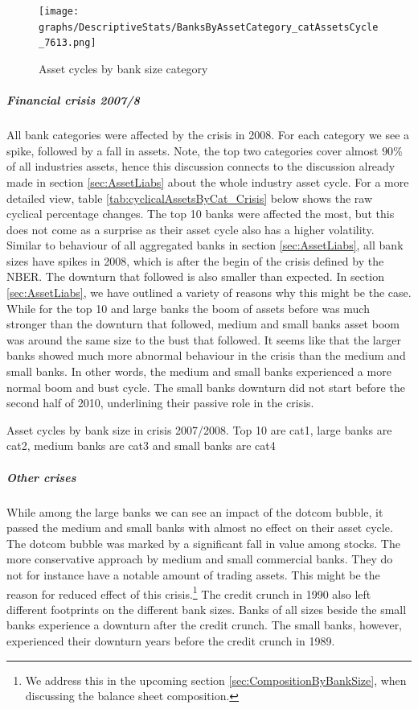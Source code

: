 \documentclass[12pt, a4paper]{article} %
\begin{document}
\begin{figure}[H]
\begin{minipage}{\textwidth}
\texttt{[image: graphs/DescriptiveStats/BanksByAssetCategory\_catAssetsCycle\_7613.png]}
\centering
\caption[1]{Asset cycles by bank size category}
\label{fig:catassetscycle}
\end{minipage}
\end{figure}

\subparagraph{Financial crisis 2007/8}
All bank categories were affected by the crisis in 2008. For each category we see a spike, followed by a fall in assets. Note, the top two categories cover almost $90\%$ of all industries assets, hence this discussion connects to the discussion already made in section \ref{sec:AssetLiabs} about the whole industry asset cycle.
For a more detailed view, table \ref{tab:cyclicalAssetsByCat_Crisis} below shows the raw cyclical percentage changes.
The top 10 banks were affected the most, but this does not come as a surprise as their asset cycle also has a higher volatility. Similar to behaviour of all aggregated banks in section \ref{sec:AssetLiabs}, all bank sizes have spikes in 2008, which is after the begin of the crisis defined by the NBER. The downturn that followed is also smaller than expected. In section \ref{sec:AssetLiabs}, we have outlined a variety of reasons why this might be the case. While for the top 10 and large banks the boom of assets before was much stronger than the downturn that followed, medium and small banks asset boom was around the same size to the bust that followed. It seems like that the larger banks showed much more abnormal behaviour in the crisis than the medium and small banks. In other words, the medium and small banks experienced a more normal boom and bust cycle.
The small banks downturn did not start before the second half of 2010, underlining their passive role in the crisis.


\begin{table}[H]
\begin{minipage}{\textwidth}

\caption[1]{Asset cycles by bank size in crisis 2007/2008. Top 10 are cat1, large banks are cat2, medium banks are cat3 and small banks are cat4}
\label{tab:cyclicalAssetsByCat_Crisis}
\end{minipage}
\end{table}

\subparagraph{Other crises}
While among the large banks we can see an impact of the dotcom bubble, it passed the medium and small banks with almost no effect on their asset cycle. The dotcom bubble was marked by a significant fall in value among stocks. 
The more conservative approach by medium and small commercial banks. They do not for instance have a notable amount of trading assets. This might be the reason for reduced effect of this crisis.\footnote{We address this in the upcoming section \ref{sec:CompositionByBankSize}, when discussing the balance sheet composition.}
The credit crunch in 1990 also left different footprints on the different bank sizes. Banks of all sizes beside the small banks experience a downturn after the credit crunch. The small banks, however, experienced their downturn years before the credit crunch in 1989. 
\end{document}
